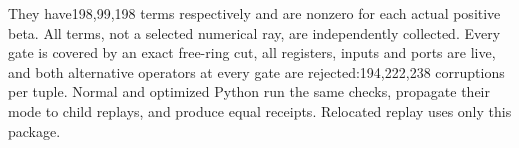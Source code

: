 They have198,99,198 terms respectively and are nonzero for each actual
positive beta. All terms, not a selected numerical ray, are
independently collected. Every gate is covered by an exact free-ring
cut, all registers, inputs and ports are live, and both alternative
operators at every gate are rejected:194,222,238 corruptions per tuple.
Normal and optimized Python run the same checks, propagate their mode to
child replays, and produce equal receipts. Relocated replay uses only
this package.
